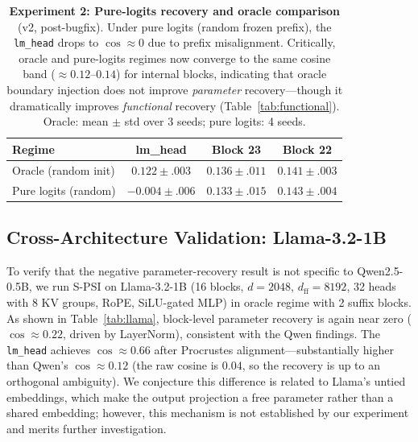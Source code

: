 \documentclass{article}
\begin{document}
\begin{table}[t]
\centering
\caption{\textbf{Experiment 2: Pure-logits recovery and oracle comparison} (v2, post-bugfix).  Under pure logits (random frozen prefix), the \texttt{lm\_head} drops to $\cos \approx 0$ due to prefix misalignment.  Critically, oracle and pure-logits regimes now converge to the same cosine band ($\approx 0.12$--$0.14$) for internal blocks, indicating that oracle boundary injection does not improve \emph{parameter} recovery---though it dramatically improves \emph{functional} recovery (Table~\ref{tab:functional}).  Oracle: mean $\pm$ std over 3 seeds; pure logits: 4 seeds.}
\label{tab:exp2}
\small
\begin{tabular}{@{}l ccc@{}}
\toprule
\textbf{Regime} & \textbf{lm\_head} & \textbf{Block 23} & \textbf{Block 22} \\
\midrule
Oracle (random init)   & $0.122 \pm .003$ & $0.136 \pm .011$ & $0.141 \pm .003$ \\
Pure logits (random)   & $-0.004 \pm .006$ & $0.133 \pm .015$ & $0.143 \pm .004$ \\
\bottomrule
\end{tabular}
\end{table}

\subsection{Cross-Architecture Validation: Llama-3.2-1B}
\label{sec:llama}

To verify that the negative parameter-recovery result is not specific to Qwen2.5-0.5B, we run S-PSI on Llama-3.2-1B (16 blocks, $d{=}2048$, $d_\text{ff}{=}8192$, 32 heads with 8 KV groups, RoPE, SiLU-gated MLP) in oracle regime with 2 suffix blocks.  As shown in Table~\ref{tab:llama}, block-level parameter recovery is again near zero ($\cos \approx 0.22$, driven by LayerNorm), consistent with the Qwen findings.  The \texttt{lm\_head} achieves $\cos \approx 0.66$ after Procrustes alignment---substantially higher than Qwen's $\cos \approx 0.12$ (the raw cosine is $0.04$, so the recovery is up to an orthogonal ambiguity).  We conjecture this difference is related to Llama's untied embeddings, which make the output projection a free parameter rather than a shared embedding; however, this mechanism is not established by our experiment and merits further investigation.
\end{document}
